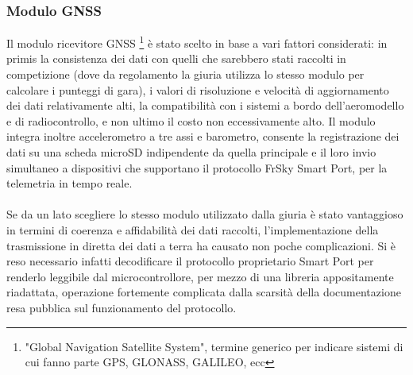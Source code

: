 \documentclass[12pt]{article}
\begin{document}
\subsubsection*{Modulo GNSS}
Il modulo ricevitore GNSS \footnote{"Global Navigation Satellite System", termine generico per indicare sistemi di cui fanno parte GPS, GLONASS, GALILEO, ecc} è stato scelto in base a vari fattori considerati: in primis la consistenza dei dati con quelli che sarebbero stati raccolti in competizione (dove da regolamento la giuria utilizza lo stesso modulo per calcolare i punteggi di gara), i valori di risoluzione e velocità di aggiornamento dei dati relativamente alti, la compatibilità con i sistemi a bordo dell'aeromodello e di radiocontrollo, e non ultimo il costo non eccessivamente alto. Il modulo integra inoltre accelerometro a tre assi e barometro, consente la registrazione dei dati su una scheda microSD indipendente da quella principale e il loro invio simultaneo a dispositivi che supportano il protocollo FrSky Smart Port, per la telemetria in tempo reale.
\\\\
Se da un lato scegliere lo stesso modulo utilizzato dalla giuria è stato vantaggioso in termini di coerenza e affidabilità dei dati raccolti, l'implementazione della trasmissione in diretta dei dati a terra ha causato non poche complicazioni. Si è reso necessario infatti decodificare il protocollo proprietario Smart Port per renderlo leggibile dal microcontrollore, per mezzo di una libreria appositamente riadattata, operazione fortemente complicata dalla scarsità della documentazione resa pubblica sul funzionamento del protocollo.
\end{document}
